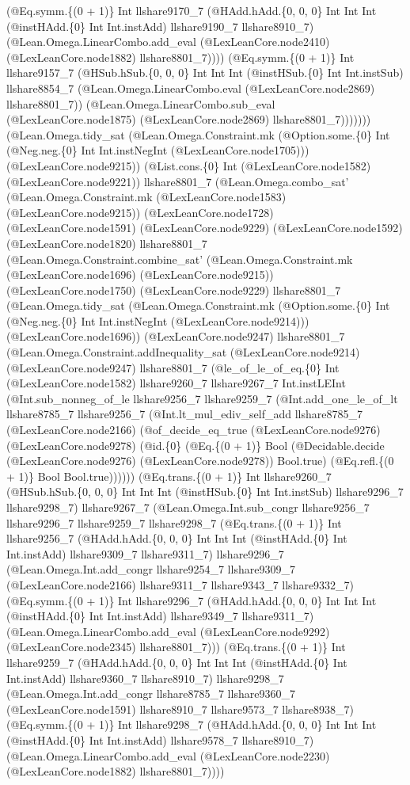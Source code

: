 \documentclass[11pt]{article}
\begin{document}
(@Eq.symm.\{(0 + 1)\} Int llshare9170\_7 (@HAdd.hAdd.\{0, 0, 0\} Int Int Int (@instHAdd.\{0\} Int Int.instAdd) llshare9190\_7 llshare8910\_7) (@Lean.Omega.LinearCombo.add\_eval (@LexLeanCore.node2410) (@LexLeanCore.node1882) llshare8801\_7)))) (@Eq.symm.\{(0 + 1)\} Int llshare9157\_7 (@HSub.hSub.\{0, 0, 0\} Int Int Int (@instHSub.\{0\} Int Int.instSub) llshare8854\_7 (@Lean.Omega.LinearCombo.eval (@LexLeanCore.node2869) llshare8801\_7)) (@Lean.Omega.LinearCombo.sub\_eval (@LexLeanCore.node1875) (@LexLeanCore.node2869) llshare8801\_7))))))) (@Lean.Omega.tidy\_sat (@Lean.Omega.Constraint.mk (@Option.some.\{0\} Int (@Neg.neg.\{0\} Int Int.instNegInt (@LexLeanCore.node1705))) (@LexLeanCore.node9215)) (@List.cons.\{0\} Int (@LexLeanCore.node1582) (@LexLeanCore.node9221)) llshare8801\_7 (@Lean.Omega.combo\_sat' (@Lean.Omega.Constraint.mk (@LexLeanCore.node1583) (@LexLeanCore.node9215)) (@LexLeanCore.node1728) (@LexLeanCore.node1591) (@LexLeanCore.node9229) (@LexLeanCore.node1592) (@LexLeanCore.node1820) llshare8801\_7 (@Lean.Omega.Constraint.combine\_sat' (@Lean.Omega.Constraint.mk (@LexLeanCore.node1696) (@LexLeanCore.node9215)) (@LexLeanCore.node1750) (@LexLeanCore.node9229) llshare8801\_7 (@Lean.Omega.tidy\_sat (@Lean.Omega.Constraint.mk (@Option.some.\{0\} Int (@Neg.neg.\{0\} Int Int.instNegInt (@LexLeanCore.node9214))) (@LexLeanCore.node1696)) (@LexLeanCore.node9247) llshare8801\_7 (@Lean.Omega.Constraint.addInequality\_sat (@LexLeanCore.node9214) (@LexLeanCore.node9247) llshare8801\_7 (@le\_of\_le\_of\_eq.\{0\} Int (@LexLeanCore.node1582) llshare9260\_7 llshare9267\_7 Int.instLEInt (@Int.sub\_nonneg\_of\_le llshare9256\_7 llshare9259\_7 (@Int.add\_one\_le\_of\_lt llshare8785\_7 llshare9256\_7 (@Int.lt\_mul\_ediv\_self\_add llshare8785\_7 (@LexLeanCore.node2166) (@of\_decide\_eq\_true (@LexLeanCore.node9276) (@LexLeanCore.node9278) (@id.\{0\} (@Eq.\{(0 + 1)\} Bool (@Decidable.decide (@LexLeanCore.node9276) (@LexLeanCore.node9278)) Bool.true) (@Eq.refl.\{(0 + 1)\} Bool Bool.true)))))) (@Eq.trans.\{(0 + 1)\} Int llshare9260\_7 (@HSub.hSub.\{0, 0, 0\} Int Int Int (@instHSub.\{0\} Int Int.instSub) llshare9296\_7 llshare9298\_7) llshare9267\_7 (@Lean.Omega.Int.sub\_congr llshare9256\_7 llshare9296\_7 llshare9259\_7 llshare9298\_7 (@Eq.trans.\{(0 + 1)\} Int llshare9256\_7 (@HAdd.hAdd.\{0, 0, 0\} Int Int Int (@instHAdd.\{0\} Int Int.instAdd) llshare9309\_7 llshare9311\_7) llshare9296\_7 (@Lean.Omega.Int.add\_congr llshare9254\_7 llshare9309\_7 (@LexLeanCore.node2166) llshare9311\_7 llshare9343\_7 llshare9332\_7) (@Eq.symm.\{(0 + 1)\} Int llshare9296\_7 (@HAdd.hAdd.\{0, 0, 0\} Int Int Int (@instHAdd.\{0\} Int Int.instAdd) llshare9349\_7 llshare9311\_7) (@Lean.Omega.LinearCombo.add\_eval (@LexLeanCore.node9292) (@LexLeanCore.node2345) llshare8801\_7))) (@Eq.trans.\{(0 + 1)\} Int llshare9259\_7 (@HAdd.hAdd.\{0, 0, 0\} Int Int Int (@instHAdd.\{0\} Int Int.instAdd) llshare9360\_7 llshare8910\_7) llshare9298\_7 (@Lean.Omega.Int.add\_congr llshare8785\_7 llshare9360\_7 (@LexLeanCore.node1591) llshare8910\_7 llshare9573\_7 llshare8938\_7) (@Eq.symm.\{(0 + 1)\} Int llshare9298\_7 (@HAdd.hAdd.\{0, 0, 0\} Int Int Int (@instHAdd.\{0\} Int Int.instAdd) llshare9578\_7 llshare8910\_7) (@Lean.Omega.LinearCombo.add\_eval (@LexLeanCore.node2230) (@LexLeanCore.node1882) llshare8801\_7)))) 
\end{document}
